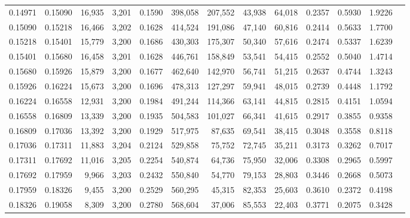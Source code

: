 \begin{tabular}{rrrrrrrrrrrrr}
0.14971 & 0.15090 & 16,935 & 3,201 &                                     0.1590 & 398,058 & 207,552 &  43,938 &  64,018 & 0.2357 & 0.5930 & 1.9226 \\
0.15090 & 0.15218 & 16,466 & 3,202 &                                     0.1628 & 414,524 & 191,086 &  47,140 &  60,816 & 0.2414 & 0.5633 & 1.7700 \\
0.15218 & 0.15401 & 15,779 & 3,200 &                                     0.1686 & 430,303 & 175,307 &  50,340 &  57,616 & 0.2474 & 0.5337 & 1.6239 \\
0.15401 & 0.15680 & 16,458 & 3,201 &                                     0.1628 & 446,761 & 158,849 &  53,541 &  54,415 & 0.2552 & 0.5040 & 1.4714 \\
0.15680 & 0.15926 & 15,879 & 3,200 &                                     0.1677 & 462,640 & 142,970 &  56,741 &  51,215 & 0.2637 & 0.4744 & 1.3243 \\
0.15926 & 0.16224 & 15,673 & 3,200 &                                     0.1696 & 478,313 & 127,297 &  59,941 &  48,015 & 0.2739 & 0.4448 & 1.1792 \\
0.16224 & 0.16558 & 12,931 & 3,200 &                                     0.1984 & 491,244 & 114,366 &  63,141 &  44,815 & 0.2815 & 0.4151 & 1.0594 \\
0.16558 & 0.16809 & 13,339 & 3,200 &                                     0.1935 & 504,583 & 101,027 &  66,341 &  41,615 & 0.2917 & 0.3855 & 0.9358 \\
0.16809 & 0.17036 & 13,392 & 3,200 &                                     0.1929 & 517,975 &  87,635 &  69,541 &  38,415 & 0.3048 & 0.3558 & 0.8118 \\
0.17036 & 0.17311 & 11,883 & 3,204 &                                     0.2124 & 529,858 &  75,752 &  72,745 &  35,211 & 0.3173 & 0.3262 & 0.7017 \\
0.17311 & 0.17692 & 11,016 & 3,205 &                                     0.2254 & 540,874 &  64,736 &  75,950 &  32,006 & 0.3308 & 0.2965 & 0.5997 \\
0.17692 & 0.17959 &  9,966 & 3,203 &                                     0.2432 & 550,840 &  54,770 &  79,153 &  28,803 & 0.3446 & 0.2668 & 0.5073 \\
0.17959 & 0.18326 &  9,455 & 3,200 &                                     0.2529 & 560,295 &  45,315 &  82,353 &  25,603 & 0.3610 & 0.2372 & 0.4198 \\
0.18326 & 0.19058 &  8,309 & 3,200 &                                     0.2780 & 568,604 &  37,006 &  85,553 &  22,403 & 0.3771 & 0.2075 & 0.3428 \\

\end{tabular}
